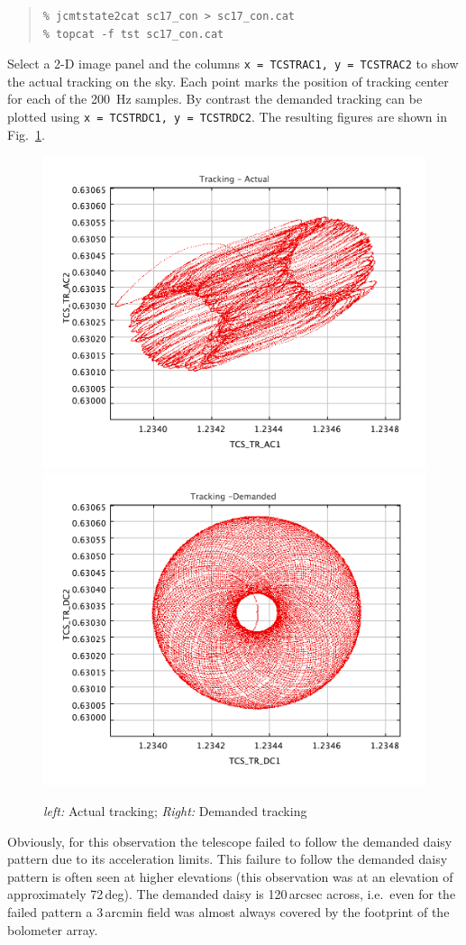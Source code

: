 \documentclass[twoside,11pt]{article}
\renewcommand{\_}{\texttt{\symbol{95}}}
\newenvironment{myquote}{\begin{quote}\begin{small}}{\end{small}\end{quote}}
\begin{document}
\begin{myquote}
\begin{verbatim}
% jcmtstate2cat sc17_con > sc17_con.cat
% topcat -f tst sc17_con.cat
\end{verbatim}
\end{myquote}

Select a 2-D image panel and the columns \texttt{x = TCS\_TR\_AC1, y =
TCS\_TR\_AC2} to show the actual tracking on the sky.  Each point
marks the position of tracking center for each of the 200~Hz samples.
By contrast the demanded tracking can be plotted using
\texttt{x~=~TCS\_TR\_DC1, y~=~TCS\_TR\_DC2}. The resulting figures are
shown in Fig.~\ref{fig:tracking}.

\begin{figure}[ht]
\begin{center}
\includegraphics[width=0.45\linewidth]{sc19_tracking_actual}
\hspace{0.03\linewidth}
\includegraphics[width=0.45\linewidth]{sc19_tracking_demand}
\caption{\textsl{left:} Actual tracking; \textsl{Right:} Demanded tracking }
\label{fig:tracking}
\end{center}
\end{figure}

Obviously, for this observation the telescope failed to follow the
demanded daisy pattern due to its acceleration limits. This failure to
follow the demanded daisy pattern is often seen at higher elevations
(this observation was at an elevation of approximately 72\,deg). The
demanded daisy is 120\,arcsec across, i.e.\ even for the failed
pattern a 3\,arcmin field was almost always covered by the footprint
of the bolometer array.
\end{document}
